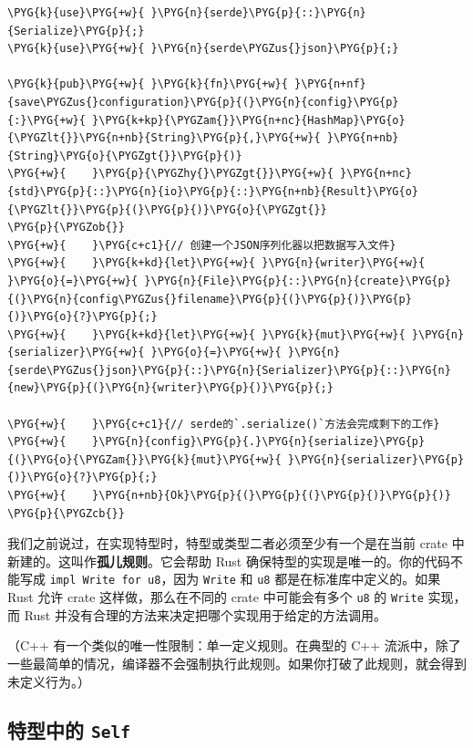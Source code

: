 \begin{Verbatim}[commandchars=\\\{\},breaklines=true,breakanywhere=true,fontsize=\codefont,xleftmargin=17bp]
\PYG{k}{use}\PYG{+w}{ }\PYG{n}{serde}\PYG{p}{::}\PYG{n}{Serialize}\PYG{p}{;}
\PYG{k}{use}\PYG{+w}{ }\PYG{n}{serde\PYGZus{}json}\PYG{p}{;}

\PYG{k}{pub}\PYG{+w}{ }\PYG{k}{fn}\PYG{+w}{ }\PYG{n+nf}{save\PYGZus{}configuration}\PYG{p}{(}\PYG{n}{config}\PYG{p}{:}\PYG{+w}{ }\PYG{k+kp}{\PYGZam{}}\PYG{n+nc}{HashMap}\PYG{o}{\PYGZlt{}}\PYG{n+nb}{String}\PYG{p}{,}\PYG{+w}{ }\PYG{n+nb}{String}\PYG{o}{\PYGZgt{}}\PYG{p}{)}
\PYG{+w}{    }\PYG{p}{\PYGZhy{}\PYGZgt{}}\PYG{+w}{ }\PYG{n+nc}{std}\PYG{p}{::}\PYG{n}{io}\PYG{p}{::}\PYG{n+nb}{Result}\PYG{o}{\PYGZlt{}}\PYG{p}{(}\PYG{p}{)}\PYG{o}{\PYGZgt{}}
\PYG{p}{\PYGZob{}}
\PYG{+w}{    }\PYG{c+c1}{// 创建一个JSON序列化器以把数据写入文件}
\PYG{+w}{    }\PYG{k+kd}{let}\PYG{+w}{ }\PYG{n}{writer}\PYG{+w}{ }\PYG{o}{=}\PYG{+w}{ }\PYG{n}{File}\PYG{p}{::}\PYG{n}{create}\PYG{p}{(}\PYG{n}{config\PYGZus{}filename}\PYG{p}{(}\PYG{p}{)}\PYG{p}{)}\PYG{o}{?}\PYG{p}{;}
\PYG{+w}{    }\PYG{k+kd}{let}\PYG{+w}{ }\PYG{k}{mut}\PYG{+w}{ }\PYG{n}{serializer}\PYG{+w}{ }\PYG{o}{=}\PYG{+w}{ }\PYG{n}{serde\PYGZus{}json}\PYG{p}{::}\PYG{n}{Serializer}\PYG{p}{::}\PYG{n}{new}\PYG{p}{(}\PYG{n}{writer}\PYG{p}{)}\PYG{p}{;}

\PYG{+w}{    }\PYG{c+c1}{// serde的`.serialize()`方法会完成剩下的工作}
\PYG{+w}{    }\PYG{n}{config}\PYG{p}{.}\PYG{n}{serialize}\PYG{p}{(}\PYG{o}{\PYGZam{}}\PYG{k}{mut}\PYG{+w}{ }\PYG{n}{serializer}\PYG{p}{)}\PYG{o}{?}\PYG{p}{;}
\PYG{+w}{    }\PYG{n+nb}{Ok}\PYG{p}{(}\PYG{p}{(}\PYG{p}{)}\PYG{p}{)}
\PYG{p}{\PYGZcb{}}
\end{Verbatim}

我们之前说过，在实现特型时，特型或类型二者必须至少有一个是在当前 crate 中新建的。这叫作\textbf{孤儿规则}。它会帮助 Rust 确保特型的实现是唯一的。你的代码不能写成 \texttt{impl Write for u8}，因为 \texttt{Write} 和 \texttt{u8} 都是在标准库中定义的。如果 Rust 允许 crate 这样做，那么在不同的 crate 中可能会有多个 \texttt{u8} 的 \texttt{Write} 实现，而 Rust 并没有合理的方法来决定把哪个实现用于给定的方法调用。

（C++ 有一个类似的唯一性限制：单一定义规则。在典型的 C++ 流派中，除了一些最简单的情况，编译器不会强制执行此规则。如果你打破了此规则，就会得到未定义行为。）

\subsection{特型中的 \texttt{Self}}

